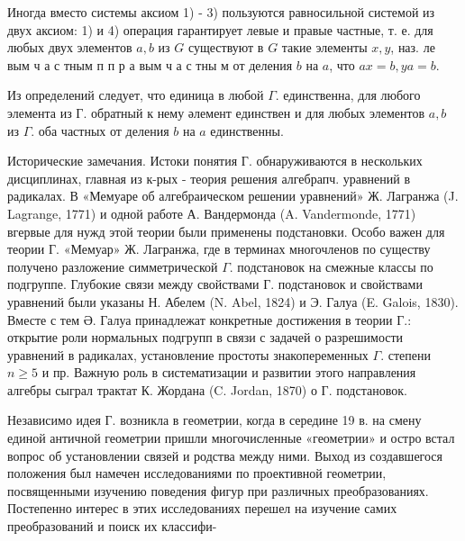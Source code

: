 \documentclass[10pt]{article}
\begin{document}
Иногда вместо системы аксиом 1) - 3) пользуются равносильной системой из двух аксиом: 1) и 4) операция гарантирует левые и правые частные, т. е. для любых двух элементов $a, b$ из $G$ существуют в $G$ такие элементы $x, y$, наз. ле вым ч а с тным п п р а вым ч а с тны м от деления $b$ на $a$, что $a x=b, y a=b$.



Из определений следует, что единица в любой $\Gamma$. единственна, для любого элемента из Г. обратный к нему әлемент единствен и для любых элементов $a, b$ из $\Gamma$. оба частных от деления $b$ на $a$ единственны.



Исторические замечания. Истоки понятия Г. обнаруживаются в нескольких дисциплинах, главная из к-рых - теория решения алгебрапч. уравнений в радикалах. В «Мемуаре об алгебраическом решении уравнений» Ж. Лагранжа (J. Lagrange, 1771) и одной работе А. Вандермонда (A. Vandermonde, 1771) вгервые для нужд этой теории были применены подстановки. Особо важен для теории Г. «Мемуар» Ж. Лагранжа, где в терминах многочленов по существу получено разложение симметрической $\Gamma$. подстановок на смежные классы по подгруппе. Глубокие связи между свойствами Г. подстановок и свойствами уравнений были указаны Н. Абелем (N. Abel, 1824) и Э. Галуа (E. Galois, 1830). Вместе с тем Ә. Галуа принадлежат конкретные достижения в теории Г.: открытие роли нормальных подгрупп в связи с задачей о разрешимости уравнений в радикалах, установление простоты знакопеременных $\Gamma$. степени $n \geqslant 5$ и пр. Важную роль в систематизации и развитии этого направления алгебры сыграл трактат К. Жордана (C. Jordan, 1870) о Г. подстановок.



Независимо идея Г. возникла в геометрии, когда в середине 19 в. на смену единой античной геометрии пришли многочисленные «геометрии» и остро встал вопрос об установлении связей и родства между ними. Выход из создавшегося положения был намечен исследованиями по проективной геометрии, посвященными изучению поведения фигур при различных преобразованиях. Постепенно интерес в этих исследованиях перешел на изучение самих преобразований и поиск их классифи-
\end{document}
